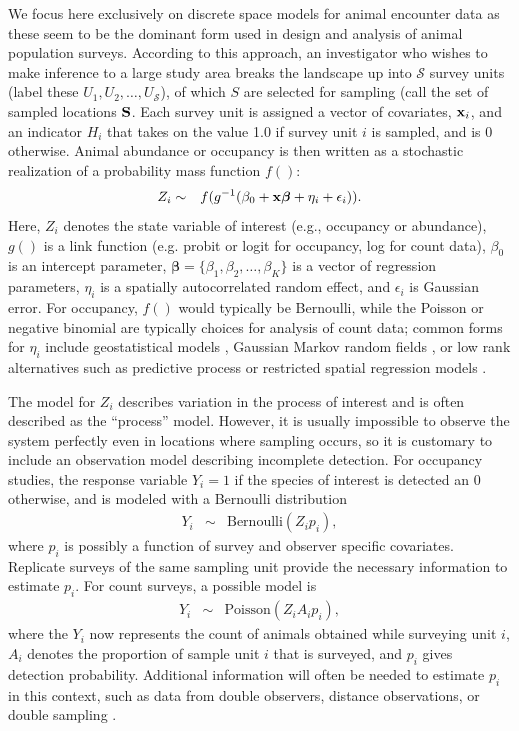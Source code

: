 \documentclass[fleqn,10pt]{wlpeerj}
\begin{document}
We focus here exclusively on discrete space models for animal encounter data as these seem to be the dominant form used in design and analysis of animal population surveys.  According to this approach, an investigator who wishes to make inference to a large study area breaks the  landscape up into $\mathcal{S}$ survey units (label these $U_1, U_2, \hdots, U_\mathcal{S}$), of which $S$ are selected for sampling (call the set of sampled locations ${\bf S}$. Each survey unit is assigned a vector of covariates, ${\bf x}_i$, and an indicator $H_i$ that takes on the value 1.0 if survey unit $i$ is sampled, and is 0 otherwise.  Animal abundance or occupancy is then written as a stochastic realization of a probability mass function $f()$:
\begin{eqnarray}
  \label{eq:process}
  Z_i & \sim & f(g^{-1}(\beta_0 + {\bf x}\boldsymbol{\beta}+\eta_i+\epsilon_i)). 
\end{eqnarray}
Here, $Z_i$ denotes the state variable of interest (e.g., occupancy or abundance), $g()$ is a link function (e.g. probit or logit for occupancy, log for count data), $\beta_0$ is an intercept parameter, $\boldsymbol{\beta} = \{ \beta_1, \beta_2, \hdots, \beta_K \}$ is a vector of regression parameters, $\eta_i$ is a spatially autocorrelated random effect, and $\epsilon_i$ is Gaussian error.  For occupancy, $f()$ would typically be Bernoulli, while the Poisson or negative binomial are typically choices for analysis of count data; common forms for $\eta_i$ include geostatistical models \citep{Cressie1993,DiggleEtAl1998}, Gaussian Markov random fields \citep[e.g. conditionally autoregressive models;][]{RueHeld2005}, or low rank alternatives such as predictive process \citep{BanerjeeEtAl2008,LatimerEtAl2009} or restricted spatial regression models \citep{Reich2006,Hughes2013}.

The model for $Z_i$ describes variation in the process of interest and is often described as the ``process'' model.  However, it is usually impossible to observe the system perfectly even in locations where sampling occurs, so it is customary to include an observation model describing incomplete detection.  For occupancy studies, the response variable $Y_i = 1$ if the species of interest is detected an 0 otherwise, and is modeled with a Bernoulli distribution \citep{Royle2008}
\begin{eqnarray}
  Y_i & \sim & \text{Bernoulli}(Z_i p_i),  
\end{eqnarray}
where $p_i$ is possibly a function of survey and observer specific covariates. Replicate surveys of the same sampling unit provide the necessary information to estimate $p_i$.   For count surveys, a possible model is 
\begin{eqnarray}
  \label{eq:obs_pois}
  Y_i & \sim & \text{Poisson}(Z_i A_i p_i),  
\end{eqnarray}
where the $Y_i$ now represents the count of animals obtained while surveying unit $i$, $A_i$ denotes the proportion of sample unit $i$ that is surveyed, and $p_i$ gives detection probability.  Additional information will often be needed to estimate $p_i$ in this context, such as data from double observers, distance observations, or double sampling \citep[see e.g.][]{BucklandEtAl2001,Royle2004,Borchers2006,ConnEtAl2014}.
\end{document}
